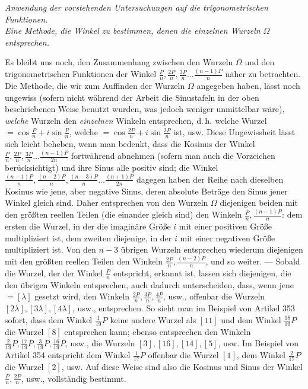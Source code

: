 \begin{center}\itshape \textit{Anwendung der vorstehenden Untersuchungen auf die trigonometrischen Funktionen.}\\\textit{Eine Methode, die Winkel zu bestimmen, denen die einzelnen Wurzeln \(\Omega\) entsprechen.}\end{center}


Es bleibt uns noch, den Zusammenhang zwischen den Wurzeln \(\Omega\) und den trigonometrischen Funktionen der Winkel \(\frac Pn,\allowbreak \frac{2P}n,\allowbreak \frac{3P}n\ldots\frac{(n-1)P}n\) näher zu betrachten. Die Methode, die wir zum Auffinden der Wurzeln \(\Omega\) angegeben haben, lässt noch ungewiss (sofern nicht während der Arbeit die Sinustafeln in der oben beschriebenen Weise benutzt wurden, was jedoch weniger unmittelbar wäre), \textit{welche} Wurzeln den \textit{einzelnen} Winkeln entsprechen, \(\text{d.\,h.}\) welche Wurzel \(=\cos\frac Pn+i\sin\frac Pn\), welche \(=\cos\frac{2P}n+i\sin\frac{2P}n\) ist, usw. Diese Ungewissheit lässt sich leicht beheben, wenn man bedenkt, dass die Kosinus der Winkel \(\frac Pn,\allowbreak \frac{2P}n,\allowbreak \frac{3P}n\ldots\frac{(n-1)P}{2n}\) fortwährend abnehmen (sofern man auch die Vorzeichen berücksichtigt) und ihre Sinus alle positiv sind; die Winkel \(\frac{(n-1)P}n,\allowbreak \frac{(n-2)P}n,\allowbreak \frac{(n-3)P}n\ldots\frac{(n+1)P}{2n}\) dagegen haben der Reihe nach dieselben Kosinus wie jene, aber negative Sinus, deren absolute Beträge den Sinus jener Winkel gleich sind. Daher entsprechen von den Wurzeln \(\Omega\) diejenigen beiden mit den größten reellen Teilen (die einander gleich sind) den Winkeln \(\frac Pn,\allowbreak \frac{(n-1)P}n\): dem ersten die Wurzel, in der die imaginäre Größe \(i\) mit einer positiven Größe multipliziert ist, dem zweiten diejenige, in der \(i\) mit einer negativen Größe multipliziert ist. Von den \(n-3\) übrigen Wurzeln entsprechen wiederum diejenigen mit den größten reellen Teilen den Winkeln \(\frac{2P}n,\allowbreak \frac{(n-2)P}n\), und so weiter. — Sobald die Wurzel, der der Winkel \(\frac Pn\) entspricht, erkannt ist, lassen sich diejenigen, die den übrigen Winkeln entsprechen, auch dadurch unterscheiden, dass, wenn jene \(=[\lambda]\) gesetzt wird, den Winkeln \(\frac{2P}n,\allowbreak \frac{3P}n,\allowbreak \frac{4P}n\), usw., offenbar die Wurzeln \([2\lambda],\allowbreak [3\lambda],\allowbreak [4\lambda]\), usw., entsprechen. So sieht man im Beispiel von Artikel 353 sofort, dass dem Winkel \(\frac1{19}P\) keine andere Wurzel als \([11]\) und dem Winkel \(\frac{18}{19}P\) die Wurzel \([8]\) entsprechen kann; ebenso entsprechen den Winkeln \(\frac2{19}P,\allowbreak \frac{17}{19}P,\allowbreak \frac3{19}P,\allowbreak \frac{16}{19}P\), usw., die Wurzeln \([3],\allowbreak [16],\allowbreak [14],\allowbreak [5]\), usw. Im Beispiel von Artikel 354 entspricht dem Winkel \(\frac1{17}P\) offenbar die Wurzel \([1]\), dem Winkel \(\frac2{17}P\) die Wurzel \([2]\), usw. Auf diese Weise sind also die Kosinus und Sinus der Winkel \(\frac Pn,\allowbreak \frac{2P}n\), usw., vollständig bestimmt.

